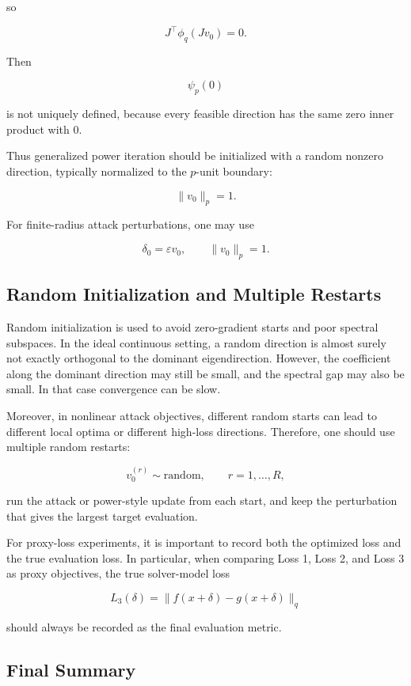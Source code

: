 \documentclass{article}
\begin{document}
so

\[
J^\top\phi_q(Jv_0)=0.
\]

Then

\[
\psi_p(0)
\]

is not uniquely defined, because every feasible direction has the same zero inner product with \(0\).

Thus generalized power iteration should be initialized with a random nonzero direction, typically normalized to the \(p\)-unit boundary:

\[
\|v_0\|_p=1.
\]

For finite-radius attack perturbations, one may use

\[
\delta_0=\varepsilon v_0,
\qquad
\|v_0\|_p=1.
\]

\subsection{Random Initialization and Multiple Restarts}

Random initialization is used to avoid zero-gradient starts and poor spectral subspaces. In the ideal continuous setting, a random direction is almost surely not exactly orthogonal to the dominant eigendirection. However, the coefficient along the dominant direction may still be small, and the spectral gap may also be small. In that case convergence can be slow.

Moreover, in nonlinear attack objectives, different random starts can lead to different local optima or different high-loss directions. Therefore, one should use multiple random restarts:

\[
v_0^{(r)}\sim \text{random},
\qquad
r=1,\dots,R,
\]

run the attack or power-style update from each start, and keep the perturbation that gives the largest target evaluation.

For proxy-loss experiments, it is important to record both the optimized loss and the true evaluation loss. In particular, when comparing Loss 1, Loss 2, and Loss 3 as proxy objectives, the true solver-model loss

\[
L_3(\delta)
=
\|f(x+\delta)-g(x+\delta)\|_q
\]

should always be recorded as the final evaluation metric.

\subsection{Final Summary}
\end{document}
